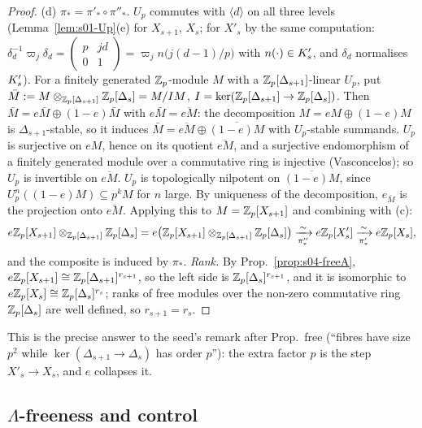\begin{proof}
(d) $\pi_*=\pi'_*\circ\pi''_*$. $U_p$ commutes with $\langle d\rangle$ on all three levels (Lemma~\ref{lem:s01-Up}(e) for $X_{s+1}$, $X_s$;
for $X'_s$ by the same computation: $\delta_d^{-1}\varpi_j\delta_d=\left(\begin{smallmatrix}p&jd\\0&1\end{smallmatrix}\right)
=\varpi_jn\big(j(d-1)/p\big)$ with $n(\cdot)\in K'_{s}$, and $\delta_d$ normalises $K'_{s}$). For a finitely generated
$\mathbb{Z}_p$-module $M$ with a $\mathbb{Z}_p[\Delta_{s+1}]$-linear $U_p$, put $\bar M:=M\otimes_{\mathbb{Z}_p[\Delta_{s+1}]}\mathbb{Z}_p[\Delta_s]=M/IM$,
$I=\ker(\mathbb{Z}_p[\Delta_{s+1}]\to\mathbb{Z}_p[\Delta_s])$. Then $\bar M=e\bar M\oplus(1-e)\bar M$ with $e\bar M=\overline{eM}$: the decomposition
$M=eM\oplus(1-e)M$ is $\Delta_{s+1}$-stable, so it induces $\bar M=\overline{eM}\oplus\overline{(1-e)M}$ with $U_p$-stable summands. $U_p$ is surjective on
$eM$, hence on its quotient $\overline{eM}$, and a surjective endomorphism of a finitely generated module over a commutative ring is
injective (Vasconcelos); so $U_p$ is invertible on $\overline{eM}$. $U_p$ is topologically nilpotent on $\overline{(1-e)M}$, since
$U_p^n((1-e)M)\subseteq p^kM$ for $n$ large. By uniqueness of the decomposition, $e_{\bar M}$ is the projection onto $\overline{eM}$. Applying this
to $M=\mathbb{Z}_p[X_{s+1}]$ and combining with (c):
\[e\mathbb{Z}_p[X_{s+1}]\otimes_{\mathbb{Z}_p[\Delta_{s+1}]}\mathbb{Z}_p[\Delta_s]=e\big(\mathbb{Z}_p[X_{s+1}]\otimes_{\mathbb{Z}_p[\Delta_{s+1}]}\mathbb{Z}_p[\Delta_s]\big)
\xrightarrow[\pi''_*]{\sim}e\mathbb{Z}_p[X'_s]\xrightarrow[\pi'_*]{\sim}e\mathbb{Z}_p[X_s],\]
and the composite is induced by $\pi_*$. \emph{Rank.} By Prop.~\ref{prop:s04-freeA}, $e\mathbb{Z}_p[X_{s+1}]\cong\mathbb{Z}_p[\Delta_{s+1}]^{r_{s+1}}$, so
the left side is $\mathbb{Z}_p[\Delta_s]^{r_{s+1}}$, and it is isomorphic to $e\mathbb{Z}_p[X_s]\cong\mathbb{Z}_p[\Delta_s]^{r_s}$; ranks of free modules over the
non-zero commutative ring $\mathbb{Z}_p[\Delta_s]$ are well defined, so $r_{s+1}=r_s$.
\end{proof}
\noindent This is the precise answer to the seed's remark after Prop.~free (``fibres have size $p^2$ while
$\ker(\Delta_{s+1}\to\Delta_s)$ has order $p$''): the extra factor $p$ is the step $X'_s\to X_s$, and $e$ collapses it.


\subsection{\texorpdfstring{$\Lambda$}{Lambda}-freeness and control}


